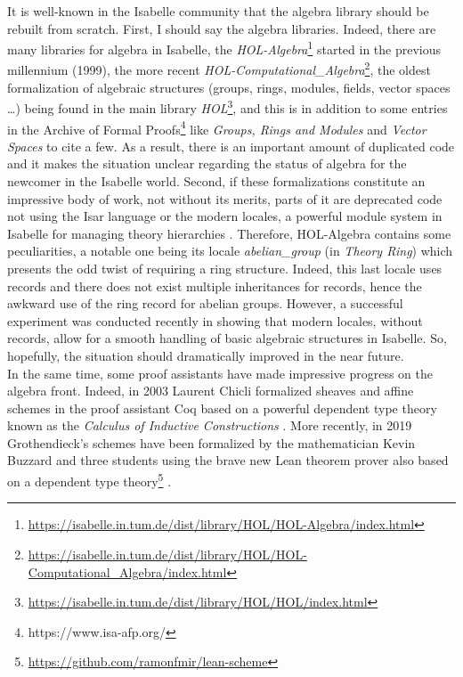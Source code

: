 \documentclass[12pt]{scrartcl}
\begin{document}
It is well-known in the Isabelle community that the algebra library should be rebuilt from scratch. First, I should say the algebra libraries. Indeed, there are many libraries for algebra in Isabelle, the \textit{HOL-Algebra}\footnote{\url{https://isabelle.in.tum.de/dist/library/HOL/HOL-Algebra/index.html}} started in the previous millennium (1999), the more recent \textit{HOL-Computational\_Algebra}\footnote{\url{https://isabelle.in.tum.de/dist/library/HOL/HOL-Computational_Algebra/index.html}}, the oldest formalization of algebraic structures (groups, rings, modules, fields, vector spaces \dots) being found in the main library \textit{HOL}\footnote{\url{https://isabelle.in.tum.de/dist/library/HOL/HOL/index.html}}, and this is in addition to some entries in the Archive of Formal Proofs\footnote{https://www.isa-afp.org/} like \textit{Groups, Rings and Modules} \cite{Group-Ring-Module-AFP} and \textit{Vector Spaces} \cite{VectorSpace-AFP} to cite a few. As a result, there is an important amount of duplicated code and it makes the situation unclear regarding the status of algebra for the newcomer in the Isabelle world. Second, if these formalizations constitute an impressive body of work, not without its merits, parts of it are deprecated code not using the Isar language or the modern locales, a powerful module system in Isabelle for managing theory hierarchies \cite{ballarin2014}. Therefore, HOL-Algebra contains some peculiarities, a notable one being its locale \emph{abelian\_group} (in \textit{Theory Ring}) which presents the odd twist of requiring a ring structure. Indeed, this last locale uses records and there does not exist multiple inheritances for records, hence the awkward use of the ring record for abelian groups. However, a successful experiment was conducted recently in \cite{ballarin20} showing that modern locales, without records, allow for a smooth handling of basic algebraic structures in Isabelle. So, hopefully, the situation should dramatically improved in the near future. \\
In the same time, some proof assistants have made impressive progress on the algebra front. Indeed, in 2003 Laurent Chicli formalized sheaves and affine schemes in the proof assistant Coq based on a powerful dependent type theory known as the \emph{Calculus of Inductive Constructions} \cite{chiclithesis}. More recently, in 2019 Grothendieck's schemes have been formalized by the mathematician Kevin Buzzard and three students using the brave new Lean theorem prover also based on a dependent type theory\footnote{\url{https://github.com/ramonfmir/lean-scheme}} \cite{schemesinLean}. \\
\end{document}
